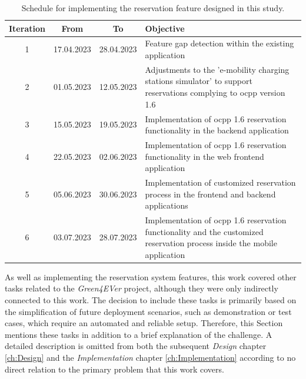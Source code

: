 \begingroup
\setlength{\tabcolsep}{10pt} %
\renewcommand{\arraystretch}{1.5} %
\begin{table}[h]
    \centering
    \caption{Schedule for implementing the reservation feature designed in this study.}
    \begin{tabular}{c|c|c|m{7cm}}
        Iteration & From & To & Objective \\
        \hline
        1 & 17.04.2023 & 28.04.2023 & Feature gap detection within the existing application \\
        2 & 01.05.2023 & 12.05.2023 & Adjustments to the 'e-mobility charging stations simulator' \cite{noauthor_github_nodate-3} to support reservations complying to \acrshort{ocpp} version 1.6 \\
        3 & 15.05.2023 & 19.05.2023 & Implementation of \acrshort{ocpp} 1.6 reservation functionality in the backend application \\
        4 & 22.05.2023 & 02.06.2023 & Implementation of \acrshort{ocpp} 1.6 reservation functionality in the web frontend application \\
        5 & 05.06.2023 & 30.06.2023 & Implementation of customized reservation process in the frontend and backend applications \\
        6 & 03.07.2023 & 28.07.2023 & Implementation of \acrshort{ocpp} 1.6 reservation functionality and the customized reservation process inside the mobile application \\
    \end{tabular}
    \label{tab:development-iterations}
\end{table}
\endgroup

As well as implementing the reservation system features, this work covered other tasks related to the \textit{Green4EVer} \cite{noauthor_hka_nodate} project, although they were only indirectly connected to this work.
The decision to include these tasks is primarily based on the simplification of future deployment scenarios, such as demonstration or test cases, which require an automated and reliable setup.
Therefore, this Section mentions these tasks in addition to a brief explanation of the challenge. A detailed description is omitted from both the subsequent \textit{Design} chapter \ref{ch:Design} and the \textit{Implementation} chapter \ref{ch:Implementation} according to no direct relation to the primary problem that this work covers.

